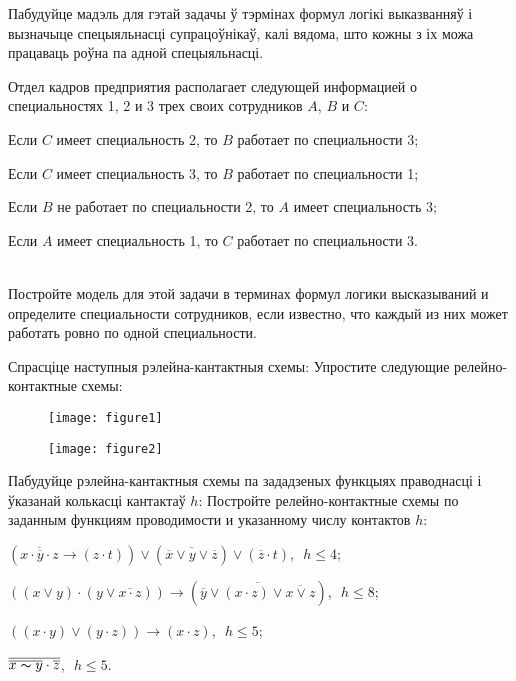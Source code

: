 \begin{problemList}
{Пабудуйце мадэль для гэтай задачы ў тэрмінах формул логікі выказванняў і вызначыце спецыяльнасці супрацоўнікаў, калі вядома, што кожны з іх можа працаваць роўна па адной спецыяльнасці.}
{Отдел кадров предприятия располагает следующей информацией о специальностях 1, 2 и 3 трех своих сотрудников $A$, $B$ и $C$:
\begin{russianEnumerate}
    \item Если $C$ имеет специальность 2, то $B$ работает по специальности 3;
    \item Если $C$ имеет специальность 3, то $B$ работает по специальности 1;
    \item Если $B$ не работает по специальности 2, то $A$ имеет специальность 3;
    \item Если $A$ имеет специальность 1, то $C$ работает по специальности 3.
\end{russianEnumerate}\\
Постройте модель для этой задачи в терминах формул логики высказываний и определите  специальности сотрудников, если известно, что каждый из них может работать ровно по  одной специальности.}

\bigskip

\problemItemWithCommonPart
{Спрасціце наступныя рэлейна-кантактныя схемы:}
{Упростите следующие релейно-контактные схемы:}
{%
\begin{figure}[H]
    \begin{center}
        \texttt{[image: figure1]}
    \end{center}
\end{figure}

\begin{figure}[H]
    \begin{center}
        \texttt{[image: figure2]}
    \end{center}
\end{figure}
}

\problemItemWithCommonPart
{Пабудуйце рэлейна-кантактныя схемы па зададзеных функцыях праводнасці і ўказанай колькасці кантактаў $h$:}
{Постройте релейно-контактные схемы по заданным функциям проводимости и указанному числу контактов $h$:}
{%
\begin{belarusianEnumerate}
    \item $(\overline{x \cdot \overline{y} \cdot z} \to (z \cdot t)) \vee
    (\overline{\overline{x} \vee y \vee \overline{z}}) \vee (\overline{z} \cdot t)$,\,\, $h \le 4$;
    \item $((x \vee y) \cdot (y \vee \overline{x \cdot z})) \to (\overline{\overline{y} \vee
    (x \cdot z) \vee \overline{x \vee z}})$,\,\, $h \le 8$;
    \item $((x \cdot y) \vee (y \cdot z)) \to (x \cdot z)$,\,\, $h \le 5$;
    \item $\overline{\overline{x \thicksim y} \cdot \overline{z}}$,\,\, $h \le 5$.
\end{belarusianEnumerate}
}


\end{problemList}
